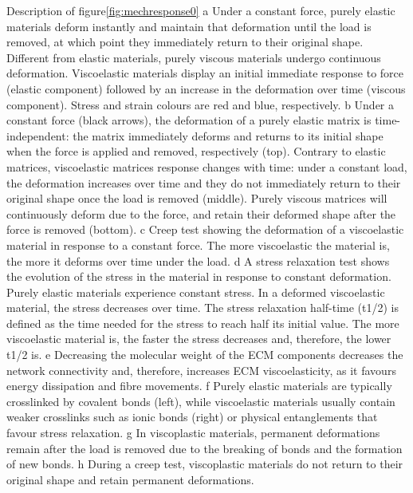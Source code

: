 Description of figure\ref{fig:mechresponse0} 
a Under a constant force, purely elastic materials deform instantly and maintain that deformation until the load is removed, at which point they immediately return to their original shape. Different from elastic materials, purely viscous materials undergo continuous deformation. Viscoelastic materials display an initial immediate response to force (elastic component) followed by an increase in the deformation over time (viscous component). Stress and strain colours are red and blue, respectively. b Under a constant force (black arrows), the deformation of a purely elastic matrix is time-independent: the matrix immediately deforms and returns to its initial shape when the force is applied and removed, respectively (top). Contrary to elastic matrices, viscoelastic matrices response changes with time: under a constant load, the deformation increases over time and they do not immediately return to their original shape once the load is removed (middle). Purely viscous matrices will continuously deform due to the force, and retain their deformed shape after the force is removed (bottom). c Creep test showing the deformation of a viscoelastic material in response to a constant force. The more  viscoelastic the material is, the more it deforms over time under the load. d A stress relaxation test shows the evolution of the stress in the material in response to constant deformation. Purely elastic materials experience constant stress. In a deformed viscoelastic material, the stress decreases over time. The stress relaxation half-time (t1/2) is defined as the time needed for the stress to reach half its initial value. The more viscoelastic material is, the faster the stress decreases and, therefore, the lower t1/2 is. e Decreasing the molecular weight of the ECM components decreases the network connectivity and, therefore, increases ECM viscoelasticity, as it favours energy dissipation and fibre movements. f Purely elastic materials are typically crosslinked by covalent bonds (left), while viscoelastic materials usually contain weaker crosslinks such as ionic bonds (right) or physical entanglements that favour stress relaxation. g In viscoplastic materials, permanent deformations remain after the load is removed due to the breaking of bonds and the formation of new bonds. h During a creep test, viscoplastic materials do not return to their original shape and retain permanent deformations\citep{courbotRoleExtracellularMatrix2025}.



